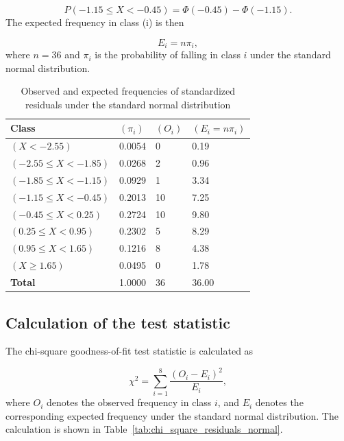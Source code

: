 \begin{equation*}
P(-1.15 \leq X < -0.45)
=
\Phi(-0.45)-\Phi(-1.15).
\end{equation*}
The expected frequency in class (i) is then

\begin{equation*}
E_i = n\pi_i,
\end{equation*}
where $n=36$ and $\pi_i$ is the probability of falling in class $i$ under the standard normal distribution.

\begin{table}[htbp]
\centering
\begin{tabularx}{\textwidth}{@{}lYYY@{}}
\toprule
\textbf{Class} & $(\pi_i)$ & $(O_i)$ & $(E_i = n\pi_i)$ \\
\midrule
$(X < -2.55)$              & 0.0054 & 0  & 0.19 \\
$(-2.55 \leq X < -1.85)$  & 0.0268 & 2  & 0.96 \\
$(-1.85 \leq X < -1.15)$  & 0.0929 & 1  & 3.34 \\
$(-1.15 \leq X < -0.45)$  & 0.2013 & 10 & 7.25 \\
$(-0.45 \leq X < 0.25)$   & 0.2724 & 10 & 9.80 \\
$(0.25 \leq X < 0.95)$    & 0.2302 & 5  & 8.29 \\
$(0.95 \leq X < 1.65)$    & 0.1216 & 8  & 4.38 \\
$(X \geq 1.65)$            & 0.0495 & 0  & 1.78 \\
\textbf{Total}             & 1.0000 & 36 & 36.00 \\
\bottomrule
\end{tabularx}
\caption{Observed and expected frequencies of standardized residuals under the standard normal distribution}
\label{tab:observed_expected_residuals_normal}
\end{table}

\subsection{Calculation of the test statistic}

The chi-square goodness-of-fit test statistic is calculated as

\begin{equation*}
\chi^2
=
\sum_{i=1}^{8}
\frac{(O_i-E_i)^2}{E_i},
\end{equation*}
where $O_i$ denotes the observed frequency in class $i$, and $E_i$ denotes the corresponding expected frequency under the standard normal distribution. The calculation is shown in Table~\ref{tab:chi_square_residuals_normal}.

